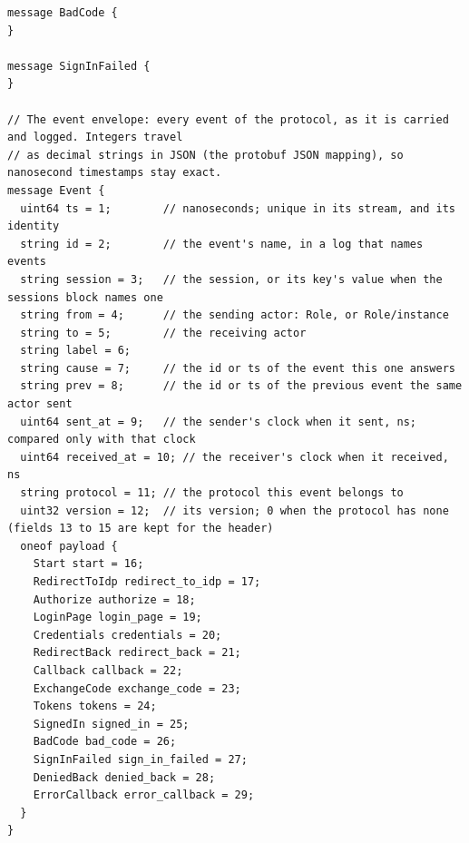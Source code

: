 \begin{lstlisting}[language={},basicstyle=\ttfamily\scriptsize,breaklines=true]
message BadCode {
}

message SignInFailed {
}

// The event envelope: every event of the protocol, as it is carried and logged. Integers travel
// as decimal strings in JSON (the protobuf JSON mapping), so nanosecond timestamps stay exact.
message Event {
  uint64 ts = 1;        // nanoseconds; unique in its stream, and its identity
  string id = 2;        // the event's name, in a log that names events
  string session = 3;   // the session, or its key's value when the sessions block names one
  string from = 4;      // the sending actor: Role, or Role/instance
  string to = 5;        // the receiving actor
  string label = 6;
  string cause = 7;     // the id or ts of the event this one answers
  string prev = 8;      // the id or ts of the previous event the same actor sent
  uint64 sent_at = 9;   // the sender's clock when it sent, ns; compared only with that clock
  uint64 received_at = 10; // the receiver's clock when it received, ns
  string protocol = 11; // the protocol this event belongs to
  uint32 version = 12;  // its version; 0 when the protocol has none (fields 13 to 15 are kept for the header)
  oneof payload {
    Start start = 16;
    RedirectToIdp redirect_to_idp = 17;
    Authorize authorize = 18;
    LoginPage login_page = 19;
    Credentials credentials = 20;
    RedirectBack redirect_back = 21;
    Callback callback = 22;
    ExchangeCode exchange_code = 23;
    Tokens tokens = 24;
    SignedIn signed_in = 25;
    BadCode bad_code = 26;
    SignInFailed sign_in_failed = 27;
    DeniedBack denied_back = 28;
    ErrorCallback error_callback = 29;
  }
}
\end{lstlisting}

